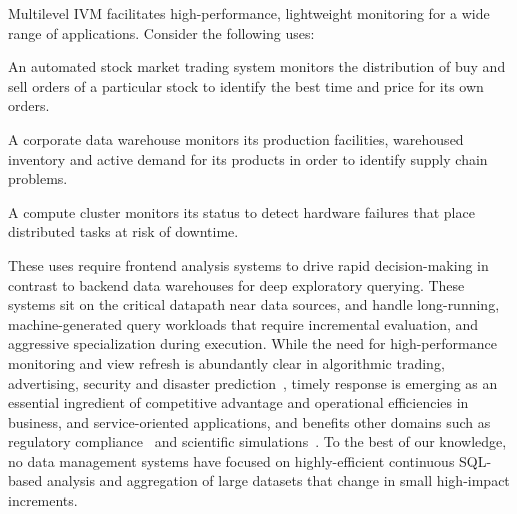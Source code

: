 
Multilevel IVM
facilitates high-performance, lightweight monitoring for a wide range of
applications. Consider the following uses:

\vspace{-2mm}
\begin{list}{}{ \leftmargin=1em}
\addtolength{\itemsep}{-0.5\baselineskip}
\item An automated stock market trading system monitors the distribution of buy
and sell orders of a particular stock to identify the best time and price for
its own orders.

\item A corporate data warehouse monitors its production facilities, warehoused
inventory and active demand for its products in order to identify
supply chain problems.

\item A compute cluster monitors its status to detect hardware failures
that place distributed tasks at risk of downtime.
\end{list}

\vspace{-1mm}
These uses require frontend analysis systems to drive rapid decision-making in
contrast to backend data warehouses for deep exploratory querying. These systems
sit on the critical datapath near data sources, and handle long-running,
machine-generated query workloads that require incremental evaluation, and
aggressive specialization during execution. While the need for
high-performance monitoring and view refresh is abundantly clear in algorithmic
trading, advertising, security and disaster prediction~\cite{scholz1973earthquake},
timely response is emerging as an essential ingredient of competitive advantage
and operational efficiencies in business, and service-oriented applications, and
benefits other domains such as regulatory compliance~\cite{basel2} and
scientific simulations~\cite{hey2009fourth}. To the best of our knowledge, no
data management systems have focused on highly-efficient continuous SQL-based analysis and aggregation
of large datasets that change in small high-impact increments.


